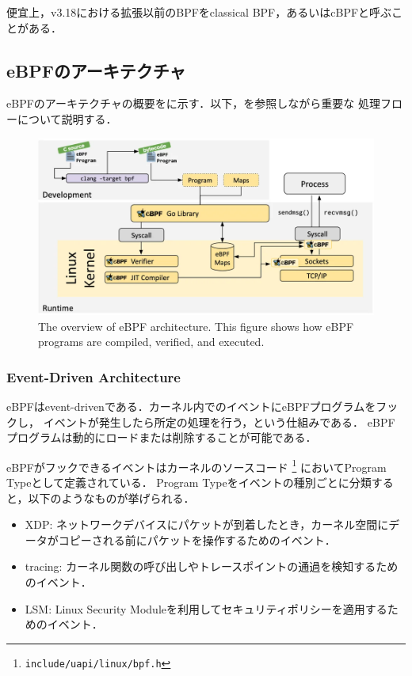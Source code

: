     便宜上，v3.18における拡張以前のBPFをclassical BPF，あるいはcBPFと呼ぶことがある．
  
  \subsection{eBPFのアーキテクチャ}
    eBPFのアーキテクチャの概要をに示す．以下，を参照しながら重要な
    処理フローについて説明する．
    \begin{figure}[tp]
      \begin{center}
        \includegraphics[width=\columnwidth]{./img/ebpf_system.png}
      \end{center}
      \caption{The overview of eBPF architecture. This figure shows how eBPF programs are compiled, verified, and executed.
      \cite{WhatiseB29:online}}
      \label{img:ebpf-system}
    \end{figure}

    \subsubsection{Event-Driven Architecture}
    eBPFはevent-drivenである．カーネル内でのイベントにeBPFプログラムをフックし，
    イベントが発生したら所定の処理を行う，という仕組みである．
    eBPFプログラムは動的にロードまたは削除することが可能である．
    
    eBPFがフックできるイベントはカーネルのソースコード \footnote{\texttt{include/uapi/linux/bpf.h}} においてProgram Typeとして定義されている．
    Program Typeをイベントの種別ごとに分類すると，以下のようなものが挙げられる．
    \begin{itemize}
      \item XDP: ネットワークデバイスにパケットが到着したとき，カーネル空間にデータがコピーされる前にパケットを操作するためのイベント．
      \item tracing: カーネル関数の呼び出しやトレースポイントの通過を検知するためのイベント．
      \item LSM: Linux Security Moduleを利用してセキュリティポリシーを適用するためのイベント．
    \end{itemize}
    
